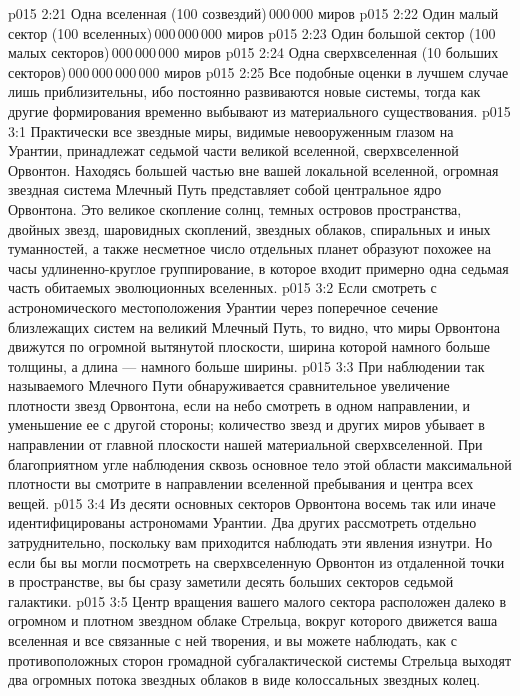 \vs p015 2:21 Одна вселенная (100 созвездий)\,000\,000 миров
\vs p015 2:22 Один малый сектор (100 вселенных)\,000\,000\,000 миров
\vs p015 2:23 Один большой сектор (100 малых секторов)\,000\,000\,000 миров
\vs p015 2:24 Одна сверхвселенная (10 больших секторов)\,000\,000\,000\,000 миров
\vs p015 2:25 \pc Все подобные оценки в лучшем случае лишь приблизительны, ибо постоянно развиваются новые системы, тогда как другие формирования временно выбывают из материального существования.
\vs p015 3:1 Практически все звездные миры, видимые невооруженным глазом на Урантии, принадлежат седьмой части великой вселенной, сверхвселенной Орвонтон. Находясь большей частью вне вашей локальной вселенной, огромная звездная система Млечный Путь представляет собой центральное ядро Орвонтона. Это великое скопление солнц, темных островов пространства, двойных звезд, шаровидных скоплений, звездных облаков, спиральных и иных туманностей, а также несметное число отдельных планет образуют похожее на часы удлиненно\hyp{}круглое группирование, в которое входит примерно одна седьмая часть обитаемых эволюционных вселенных.
\vs p015 3:2 Если смотреть с астрономического местоположения Урантии через поперечное сечение близлежащих систем на великий Млечный Путь, то видно, что миры Орвонтона движутся по огромной вытянутой плоскости, ширина которой намного больше толщины, а длина --- намного больше ширины.
\vs p015 3:3 При наблюдении так называемого Млечного Пути обнаруживается сравнительное увеличение плотности звезд Орвонтона, если на небо смотреть в одном направлении, и уменьшение ее с другой стороны; количество звезд и других миров убывает в направлении от главной плоскости нашей материальной сверхвселенной. При благоприятном угле наблюдения сквозь основное тело этой области максимальной плотности вы смотрите в направлении вселенной пребывания и центра всех вещей.
\vs p015 3:4 \pc Из десяти основных секторов Орвонтона восемь так или иначе идентифицированы астрономами Урантии. Два других рассмотреть отдельно затруднительно, поскольку вам приходится наблюдать эти явления изнутри. Но если бы вы могли посмотреть на сверхвселенную Орвонтон из отдаленной точки в пространстве, вы бы сразу заметили десять больших секторов седьмой галактики.
\vs p015 3:5 Центр вращения вашего малого сектора расположен далеко в огромном и плотном звездном облаке Стрельца, вокруг которого движется ваша вселенная и все связанные с ней творения, и вы можете наблюдать, как с противоположных сторон громадной субгалактической системы Стрельца выходят два огромных потока звездных облаков в виде колоссальных звездных колец.
